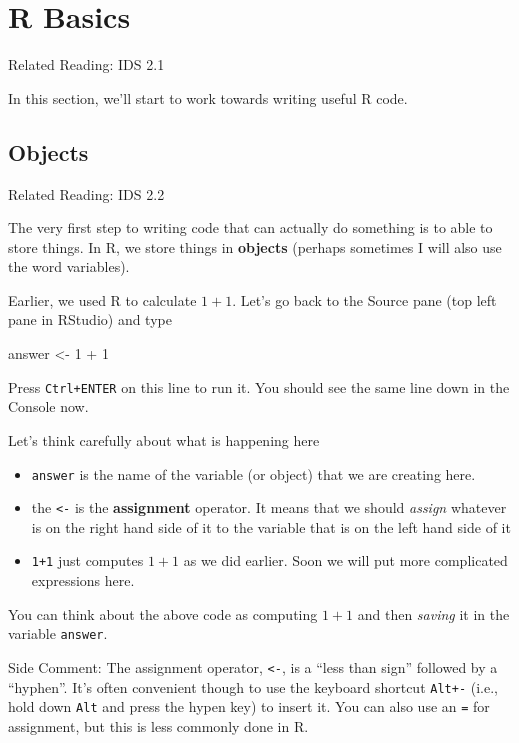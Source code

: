 \documentclass[
  letterpaper,
  DIV=11,
  numbers=noendperiod]{scrreprt}
\newenvironment{Shaded}{\begin{snugshade}}{\end{snugshade}}
\newcommand{\DecValTok}[1]{\textcolor[rgb]{0.68,0.00,0.00}{#1}}
\newcommand{\NormalTok}[1]{\textcolor[rgb]{0.00,0.23,0.31}{#1}}
\newcommand{\OtherTok}[1]{\textcolor[rgb]{0.00,0.23,0.31}{#1}}
\newcommand{\SpecialCharTok}[1]{\textcolor[rgb]{0.37,0.37,0.37}{#1}}
\begin{document}
\section{R Basics}\label{r-basics}

Related Reading: IDS 2.1

In this section, we'll start to work towards writing useful R code.

\subsection{Objects}\label{objects}

Related Reading: IDS 2.2

The very first step to writing code that can actually do something is to
able to store things. In R, we store things in \textbf{objects} (perhaps
sometimes I will also use the word variables).

Earlier, we used R to calculate \(1+1\). Let's go back to the Source
pane (top left pane in RStudio) and type

\begin{Shaded}
\begin{Highlighting}[]
\NormalTok{answer }\OtherTok{\textless{}{-}} \DecValTok{1} \SpecialCharTok{+} \DecValTok{1}
\end{Highlighting}
\end{Shaded}

Press \texttt{Ctrl+ENTER} on this line to run it. You should see the
same line down in the Console now.

Let's think carefully about what is happening here

\begin{itemize}
\item
  \texttt{answer} is the name of the variable (or object) that we are
  creating here.
\item
  the \texttt{\textless{}-} is the \textbf{assignment} operator. It
  means that we should \emph{assign} whatever is on the right hand side
  of it to the variable that is on the left hand side of it
\item
  \texttt{1+1} just computes \(1+1\) as we did earlier. Soon we will put
  more complicated expressions here.
\end{itemize}

You can think about the above code as computing \(1+1\) and then
\emph{saving} it in the variable \texttt{answer}.

{Side Comment:} The assignment operator, \texttt{\textless{}-}, is a
``less than sign'' followed by a ``hyphen''. It's often convenient
though to use the keyboard shortcut \texttt{Alt+-} (i.e., hold down
\texttt{Alt} and press the hypen key) to insert it. You can also use an
\texttt{=} for assignment, but this is less commonly done in R.
\end{document}
